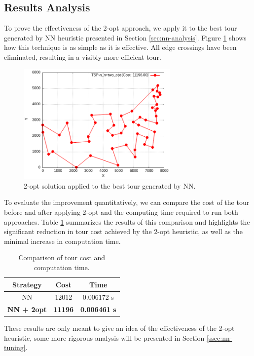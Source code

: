 \subsection{Results Analysis}
To prove the effectiveness of the 2-opt approach, we apply it to the best tour generated by NN heuristic presented in Section \ref{sec:nn-analysis}.
Figure \ref{fig:nn-2opt-example} shows how this technique is as simple as it is effective. All edge crossings have been eliminated, resulting in a visibly more efficient tour.

\begin{figure}[h!]
    \centering
    \includegraphics[width=0.7\textwidth]{images/TSP_n_n+two_opt.png}
    \caption{2-opt solution applied to the best tour generated by NN.}
    \label{fig:nn-2opt-example}
\end{figure}

To evaluate the improvement quantitatively, we can compare the cost of the tour before and after applying 2-opt and the computing time required to run both approaches. Table \ref{tab:nn-vs-2opt} summarizes the results of this comparison and highlights the significant reduction in tour cost achieved by the 2-opt heuristic, as well as the minimal increase in computation time.

\begin{table}[h!]
    \centering
    \caption{Comparison of tour cost and computation time.}
    \begin{tabular}{|c|c|c|}
        \hline
        Strategy & Cost & Time \\
        \hline
        NN        & 12012 & 0.006172 s \\
        \textbf{NN + 2opt} & \textbf{11196} & \textbf{0.006461 s} \\
        \hline
    \end{tabular}
    \label{tab:nn-vs-2opt}
\end{table}

These results are only meant to give an idea of the effectiveness of the 2-opt heuristic, some more rigorous analysis will be presented in Section \ref{ssec:nn-tuning}.
